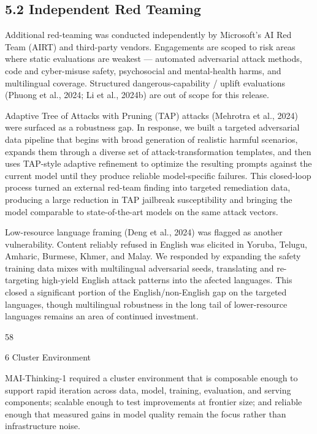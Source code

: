 \documentclass[
  10
]{article}
\begin{document}
\subsection{5.2 Independent Red Teaming}\label{independent-red-teaming}

Additional red-teaming was conducted independently by Microsoft's AI Red
Team (AIRT) and third-party vendors. Engagements are scoped to risk
areas where static evaluations are weakest --- automated adversarial
attack methods, code and cyber-misuse safety, psychosocial and
mental-health harms, and multilingual coverage. Structured
dangerous-capability / uplift evaluations (Phuong et al., 2024; Li et
al., 2024b) are out of scope for this release.

Adaptive Tree of Attacks with Pruning (TAP) attacks (Mehrotra et al.,
2024) were surfaced as a robustness gap. In response, we built a
targeted adversarial data pipeline that begins with broad generation of
realistic harmful scenarios, expands them through a diverse set of
attack-transformation templates, and then uses TAP-style adaptive
refinement to optimize the resulting prompts against the current model
until they produce reliable model-specific failures. This closed-loop
process turned an external red-team finding into targeted remediation
data, producing a large reduction in TAP jailbreak susceptibility and
bringing the model comparable to state-of-the-art models on the same
attack vectors.

Low-resource language framing (Deng et al., 2024) was flagged as another
vulnerability. Content reliably refused in English was elicited in
Yoruba, Telugu, Amharic, Burmese, Khmer, and Malay. We responded by
expanding the safety training data mixes with multilingual adversarial
seeds, translating and re-targeting high-yield English attack patterns
into the afected languages. This closed a significant portion of the
English/non-English gap on the targeted languages, though multilingual
robustness in the long tail of lower-resource languages remains an area
of continued investment.

58

6 Cluster Environment

MAI-Thinking-1 required a cluster environment that is composable enough
to support rapid iteration across data, model, training, evaluation, and
serving components; scalable enough to test improvements at frontier
size; and reliable enough that measured gains in model quality remain
the focus rather than infrastructure noise.
\end{document}
